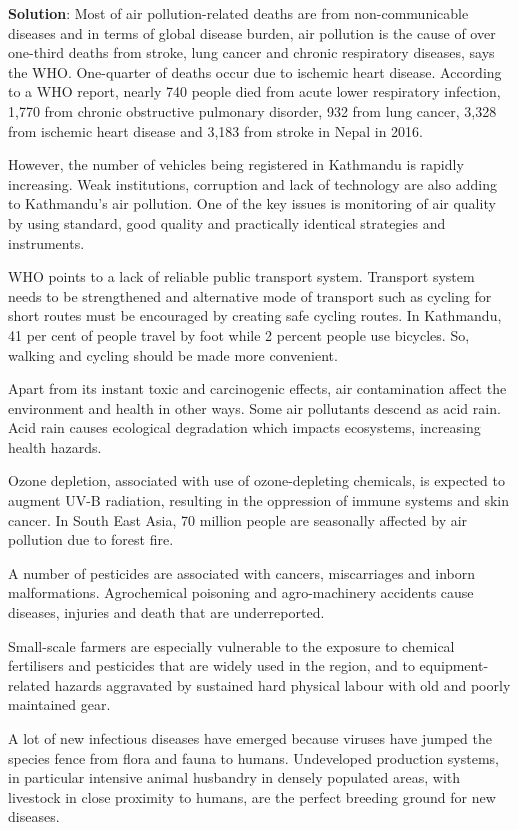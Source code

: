 \documentclass[
  openany]{book}
\newenvironment{solution}{ {\bfseries Solution}:}{}
\begin{document}
\begin{questions}
\begin{solution}
Most of air pollution-related deaths are from non-communicable diseases and in terms of global disease burden, air pollution is the cause of over one-third deaths from stroke, lung cancer and chronic respiratory diseases, says the WHO. One-quarter of deaths occur due to ischemic heart disease. According to a WHO report, nearly 740 people died from acute lower respiratory infection, 1,770 from chronic obstructive pulmonary disorder, 932 from lung cancer, 3,328 from ischemic heart disease and 3,183 from stroke in Nepal in 2016.

However, the number of vehicles being registered in Kathmandu is rapidly increasing. Weak institutions, corruption and lack of technology are also adding to Kathmandu’s air pollution. One of the key issues is monitoring of air quality by using standard, good quality and practically identical strategies and instruments.

WHO points to a lack of reliable public transport system. Transport system needs to be strengthened and alternative mode of transport such as cycling for short routes must be encouraged by creating safe cycling routes. In Kathmandu, 41 per cent of people travel by foot while 2 percent people use bicycles. So, walking and cycling should be made more convenient.

Apart from its instant toxic and carcinogenic effects, air contamination affect the environment and health in other ways. Some air pollutants descend as acid rain. Acid rain causes ecological degradation which impacts ecosystems, increasing health hazards. 

Ozone depletion, associated with use of ozone-depleting chemicals, is expected to augment UV-B radiation, resulting in the oppression of immune systems and skin cancer. In South East Asia, 70 million people are seasonally affected by air pollution due to forest fire.

A number of pesticides are associated with cancers, miscarriages and inborn malformations. Agrochemical poisoning and agro-machinery accidents cause diseases, injuries and death that are underreported.

Small-scale farmers are especially vulnerable to the exposure to chemical fertilisers and pesticides that are widely used in the region, and to equipment-related hazards aggravated by sustained hard physical labour with old and poorly maintained gear.

A lot of new infectious diseases have emerged because viruses have jumped the species fence from flora and fauna to humans. Undeveloped production systems, in particular intensive animal husbandry in densely populated areas, with livestock in close proximity to humans, are the perfect breeding ground for new diseases.


\end{solution}
\end{questions}
\end{document}
